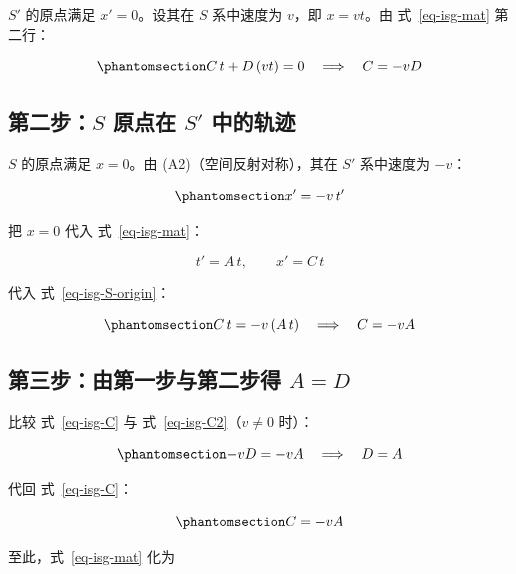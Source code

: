 \documentclass[
  chinese,
  a4paper,
  UTF8,
  12pt,
  oneside,
  openany]{ctexbook}
\theoremstyle{plain}
\theoremstyle{plain}
\theoremstyle{plain}
\theoremstyle{definition}
\theoremstyle{plain}
\theoremstyle{plain}
\theoremstyle{remark}
\begin{document}
\(S'\) 的原点满足 \(x'=0\)。设其在 \(S\) 系中速度为 \(v\)，即
\(x=vt\)。由 式~\ref{eq-isg-mat} 第二行：

\begin{equation}\protect\phantomsection\label{eq-isg-C}{
C\,t+D\,(vt)=0\quad\Longrightarrow\quad C=-vD
}\end{equation}

\subsection{\texorpdfstring{第二步：\(S\) 原点在 \(S'\)
中的轨迹}{第二步：S 原点在 S\textquotesingle{} 中的轨迹}}\label{ux7b2cux4e8cux6b65s-ux539fux70b9ux5728-s-ux4e2dux7684ux8f68ux8ff9}

\(S\) 的原点满足 \(x=0\)。由 (A2)（空间反射对称），其在 \(S'\)
系中速度为 \(-v\)：

\begin{equation}\protect\phantomsection\label{eq-isg-S-origin}{
x'=-v\,t'
}\end{equation}

把 \(x=0\) 代入 式~\ref{eq-isg-mat}：

\[
t'=A\,t,\qquad x'=C\,t
\]

代入 式~\ref{eq-isg-S-origin}：

\begin{equation}\protect\phantomsection\label{eq-isg-C2}{
C\,t=-v\,(A\,t)\quad\Longrightarrow\quad C=-vA
}\end{equation}

\subsection{\texorpdfstring{第三步：由第一步与第二步得
\(A=D\)}{第三步：由第一步与第二步得 A=D}}\label{ux7b2cux4e09ux6b65ux7531ux7b2cux4e00ux6b65ux4e0eux7b2cux4e8cux6b65ux5f97-ad}

比较 式~\ref{eq-isg-C} 与 式~\ref{eq-isg-C2}（\(v\neq0\) 时）：

\begin{equation}\protect\phantomsection\label{eq-isg-AD}{
-vD=-vA\quad\Longrightarrow\quad D=A
}\end{equation}

代回 式~\ref{eq-isg-C}：

\begin{equation}\protect\phantomsection\label{eq-isg-C3}{
C=-vA
}\end{equation}

至此，式~\ref{eq-isg-mat} 化为
\end{document}
